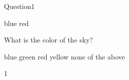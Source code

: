 \documentclass{exam}
\begin{document}
	\begin{mcquestions}
		\question Question1
			\begin{mcanswerslist}
				\answer blue
				\answer[correct] red
			\end{mcanswerslist}
			\question What is the color of the sky?
\begin{mcanswerslist}[fixlast]
\answer blue
\answer green
\answer red
\answer yellow
\answer none of the above
\end{mcanswerslist}1
	\end{mcquestions}
\end{document}
